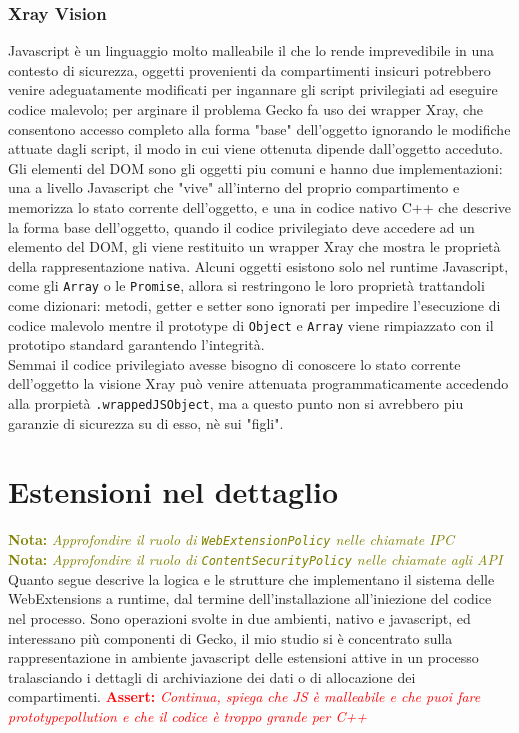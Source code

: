 \documentclass[]{./sapthesis/sapthesis}
\newcommand{\MComment}[3]{\textcolor{#3}{ \textbf{#1} \textit{#2}}}
\newcommand{\Nota}[1]{\MComment{Nota:}{#1}{olive}}
\newcommand{\Assert}[1]{\MComment{Assert:}{#1}{red}}
\newcommand{\code}[1]{\texttt{#1}}
\newcommand{\WebExtensionPolicy}{\code{WebExtensionPolicy} }
\newcommand{\ContentSecurityPolicy}{\code{ContentSecurityPolicy} }
\begin{document}
        \subsection{Xray Vision}
            Javascript è un linguaggio molto malleabile il che lo rende imprevedibile in una contesto di
            sicurezza, oggetti provenienti da compartimenti insicuri potrebbero venire adeguatamente
            modificati per ingannare gli script privilegiati ad eseguire codice malevolo; per arginare
            il problema Gecko fa uso dei wrapper Xray, che consentono accesso completo alla forma "base"
            dell'oggetto ignorando le modifiche attuate dagli script, il modo in cui viene ottenuta
            dipende dall'oggetto acceduto.\\
            Gli elementi del DOM sono gli oggetti piu comuni e hanno due implementazioni: 
            una a livello Javascript che "vive" all'interno del proprio compartimento e memorizza lo
            stato corrente dell'oggetto, e una in codice nativo C++ che descrive la forma base
            dell'oggetto, quando il codice privilegiato deve accedere ad un elemento del DOM, gli viene
            restituito un wrapper Xray che mostra le proprietà della rappresentazione nativa. 
            Alcuni oggetti esistono solo nel runtime Javascript, come gli \code{Array} o le \code{Promise},
            allora si restringono le loro proprietà trattandoli come dizionari: metodi, getter e setter 
            sono ignorati per impedire l'esecuzione di codice malevolo mentre il prototype di \code{Object}
            e \code{Array} viene rimpiazzato con il prototipo standard garantendo l'integrità.\\
            Semmai il codice privilegiato avesse bisogno di conoscere lo stato corrente dell'oggetto la
            visione Xray può venire attenuata programmaticamente accedendo alla prorpietà \code{.wrappedJSObject},
            ma a questo punto non si avrebbero piu garanzie di sicurezza su di esso, nè sui "figli".
\newpage

\chapter{Estensioni nel dettaglio}
    \Nota{Approfondire il ruolo di \WebExtensionPolicy nelle chiamate IPC}\\
    \Nota{Approfondire il ruolo di \ContentSecurityPolicy nelle chiamate agli API }\\
    Quanto segue descrive la logica e le strutture che implementano il sistema delle WebExtensions a runtime,
    dal termine dell'installazione all'iniezione del codice nel processo. Sono operazioni svolte in due ambienti,
    nativo e javascript, ed interessano più componenti di Gecko, il mio studio si è concentrato sulla
    rappresentazione in ambiente javascript delle estensioni attive in un processo tralasciando i dettagli
    di archiviazione dei dati o di allocazione dei compartimenti.
    \Assert{Continua, spiega che JS è malleabile e che puoi fare prototypepollution e che il codice è troppo grande per C++}
\end{document}
